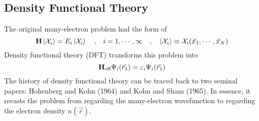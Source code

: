 \documentclass[12pt,a4paper,titlepage]{article}
\newcommand{\trm}[1]{\textrm{#1}} %
\newcommand{\Chi}{\mathcal{X}} %
\begin{document}
\subsection{Density Functional Theory}
The original many-electron problem had the form of
\begin{equation}
\vb{H}\ket{\Chi_{i}}=E_{i}\ket{\Chi_{i}}\qq{,}i=1,\cdots,\infty\qq{,}\ket{\Chi_{i}}\equiv\Chi_{i}(\vec{x}_{1},\cdots,\vec{x}_{N})
\end{equation}
Density functional theory (DFT) transforms this problem into
\begin{equation}
\vb{H}_{\trm{eff}}\Psi_{i}(\vec{r}_{1})=\varepsilon_{i}\Psi_{i}(\vec{r}_{1})
\end{equation}
The history of density functional theory can be traced back to two seminal papers: Hohenberg and Kohn (1964) and Kohn and Sham (1965). In essence, it recasts the problem from regarding the many-electron wavefunction to regarding the electron density $n(\vec{r})$.
\end{document}
